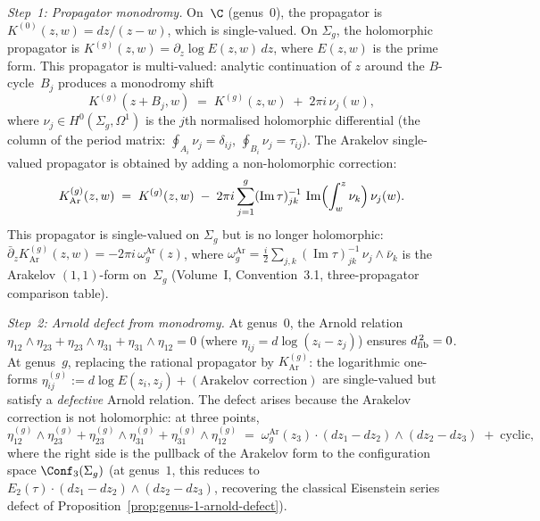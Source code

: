 \begin{construction}
\begin{enumerate}[label=\textup{(\roman*)}]
 \smallskip\noindent
 \emph{Step~1: Propagator monodromy.}
 On~$\C$ (genus~$0$), the propagator is
 $K^{(0)}(z,w) = dz/(z-w)$, which is single-valued. On
 $\Sigma_g$, the holomorphic propagator is
 $K^{(g)}(z,w) = \partial_z \log E(z,w)\,dz$,
 where $E(z,w)$ is the prime form. This propagator is
 multi-valued: analytic continuation of $z$ around the
 $B$-cycle~$B_j$ produces a monodromy shift
 \begin{equation}\label{eq:propagator-monodromy}
 K^{(g)}(z + B_j, w)
 \;=\;
 K^{(g)}(z,w)
 \;+\;
 2\pi i\, \nu_j(w),
 \end{equation}
 where $\nu_j \in H^0(\Sigma_g, \Omega^1)$ is the $j$th
 normalised holomorphic differential (the column of the period
 matrix: $\oint_{A_i} \nu_j = \delta_{ij}$,
 $\oint_{B_i} \nu_j = \tau_{ij}$). The Arakelov
 single-valued propagator is obtained by adding a
 non-holomorphic correction:
 \[
 K^{(g)}_{\mathrm{Ar}}(z,w)
 \;=\;
 K^{(g)}(z,w)
 \;-\;
 2\pi i \sum_{j=1}^g
 (\operatorname{Im}\tau)^{-1}_{jk}\,
 \operatorname{Im}\Bigl(\int_w^z \nu_k\Bigr)\, \nu_j(w).
 \]
 This propagator is single-valued on $\Sigma_g$ but is no longer
 holomorphic: $\bar\partial_z K^{(g)}_{\mathrm{Ar}}(z,w)
 = -2\pi i\, \omega_g^{\mathrm{Ar}}(z)$, where $\omega_g^{\mathrm{Ar}} = \frac{i}{2}
 \sum_{j,k} (\operatorname{Im}\tau)^{-1}_{jk}\,
 \nu_j \wedge \bar{\nu}_k$ is the Arakelov $(1,1)$-form
 on~$\Sigma_g$ (Volume~I, Convention~3.1, three-propagator
 comparison table).

 \smallskip\noindent
 \emph{Step~2: Arnold defect from monodromy.}
 At genus~$0$, the Arnold relation
 $\eta_{12} \wedge \eta_{23} + \eta_{23} \wedge \eta_{31}
 + \eta_{31} \wedge \eta_{12} = 0$
 (where $\eta_{ij} = d\log(z_i - z_j)$) ensures
 $d_{\mathrm{fib}}^{\,2} = 0$. At genus~$g$, replacing the rational
 propagator by $K^{(g)}_{\mathrm{Ar}}$: the logarithmic
 one-forms
 $\eta^{(g)}_{ij} := d\log E(z_i, z_j) +
 (\text{Arakelov correction})$ are single-valued but
 satisfy a \emph{defective} Arnold relation. The defect
 arises because the Arakelov correction is not holomorphic:
 at three points,
 \begin{equation}\label{eq:arnold-defect-genus-g}
 \eta^{(g)}_{12} \wedge \eta^{(g)}_{23}
 + \eta^{(g)}_{23} \wedge \eta^{(g)}_{31}
 + \eta^{(g)}_{31} \wedge \eta^{(g)}_{12}
 \;=\;
 \omega_g^{\mathrm{Ar}}(z_3) \cdot
 (dz_1 - dz_2) \wedge (dz_2 - dz_3)
 \;+\; \text{cyclic},
 \end{equation}
 where the right side is the pullback of the Arakelov form to the
 configuration space $\Conf_3(\Sigma_g)$
 (at genus~$1$, this reduces to $E_2(\tau) \cdot (dz_1 - dz_2)
 \wedge (dz_2 - dz_3)$, recovering the classical Eisenstein
 series defect of
 Proposition~\ref{prop:genus-1-arnold-defect}).


\end{enumerate}
\end{construction}
